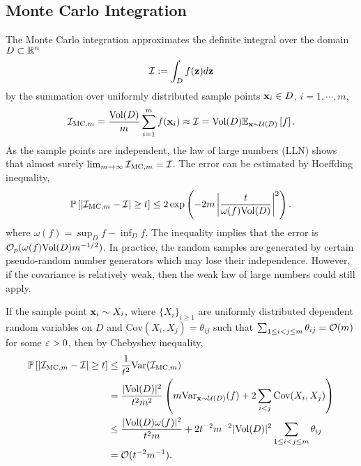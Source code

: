 \subsection{Monte Carlo Integration}
The Monte Carlo integration approximates the definite integral over the domain $D\subset \mathbb R^n$
\begin{equation}
    \mathcal I := \int_{D} f(\mathbf z) d\mathbf z 
\end{equation}
by the summation over uniformly distributed sample points $\mathbf x_i\in D$, $i=1,\cdots, m$,
\begin{equation}
    \mathcal I_{\textrm{MC}, m} = \frac{\textrm{Vol}(D)}{m} \sum_{i=1}^m f(\mathbf x_i) \approx \mathcal I = \textrm{Vol}(D)\mathbb E_{\mathbf x\sim \mathcal U(D)} \left[f\right].
\end{equation}
As the sample points are independent, the law of large numbers (LLN) shows that almost surely $\lim_{m\to \infty} \mathcal I_{\textrm{MC}, m} = \mathcal I$. 
The error can be estimated by Hoeffding inequality,  
\begin{equation}
    \mathbb P\left[|\mathcal I_{\textrm{MC}, m} - \mathcal I |\ge t\right] \le 2 \exp\left(-2m \left|\frac{t}{ \omega(f) \textrm{Vol}(D)}\right|^2 \right).
\end{equation}
where $\omega(f) = \sup_D f - \inf_D f$. The inequality implies that the error is $\mathcal O_p( \omega(f) \textrm{Vol}(D) m^{-1/2})$. In practice, the random samples are generated by certain pseudo-random number generators which may lose their independence. However, if the covariance is relatively weak, then the weak law of large numbers could still apply.
\begin{example}
    If the sample point $\mathbf x_i\sim X_i$, where $\{X_i\}_{i\ge 1}$ are uniformly distributed dependent random variables on $D$ and $\textrm{Cov}(X_i, X_j) = \theta_{ij}$ such that $\sum_{1\le i<j\le m} \theta_{ij} = \mathcal O(m)$ for some $\varepsilon > 0$, then by Chebyshev inequality, 
    \begin{equation}
    \begin{aligned}
        \mathbb P\left[ |\mathcal I_{\textrm{MC}, m} - \mathcal I |\ge t \right] &\le \frac{1}{t^2} \textrm{Var}(\mathcal I_{\textrm{MC}, m} ) \\
        &= \frac{|\textrm{Vol}(D)|^2}{t^2 m^2} \left(m  \textrm{Var}_{\mathbf x\sim \mathcal U(D)}(f) + 2 \sum_{i < j} \textrm{Cov}(X_i, X_j) \right) \\
        &\le \frac{ |\textrm{Vol}(D) \omega(f)|^2 }{t^2 m} + 2 t^{-2} m^{-2} |\textrm{Vol}(D)|^2 \sum_{1\le i < j \le m} \theta_{ij} \\
        &= \mathcal O(t^{-2} m^{-1}).
    \end{aligned}
    \end{equation}
\end{example}
